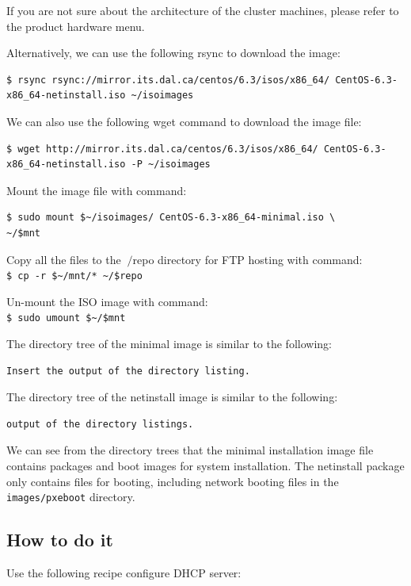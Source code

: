 If you are not sure about the architecture of the cluster machines, please refer to the product hardware menu.

Alternatively, we can use the following rsync to download the image:
\lstset{style=bashstyle}
\begin{lstlisting}
$ rsync rsync://mirror.its.dal.ca/centos/6.3/isos/x86_64/ CentOS-6.3-x86_64-netinstall.iso ~/isoimages
\end{lstlisting}

We can also use the following wget command to download the image file: 
\lstset{style=bashstyle}
\begin{lstlisting}
$ wget http://mirror.its.dal.ca/centos/6.3/isos/x86_64/ CentOS-6.3-x86_64-netinstall.iso -P ~/isoimages
\end{lstlisting}

Mount the image file with command:
\lstset{style=bashstyle}
\begin{lstlisting}
$ sudo mount $~/isoimages/ CentOS-6.3-x86_64-minimal.iso \
~/$mnt
\end{lstlisting}

Copy all the files to the $~/$repo directory for FTP hosting with command: \\
\verb|$ cp -r $~/mnt/* ~/$repo|

Un-mount the ISO image with command: \\
\verb|$ sudo umount $~/$mnt|

The directory tree of the minimal image is similar to the following:
\begin{verbatim}
Insert the output of the directory listing.
\end{verbatim}

The directory tree of the netinstall image is similar to the following:
\begin{verbatim}
output of the directory listings.
\end{verbatim}
We can see from the directory trees that the minimal installation image file contains packages and boot images for system installation. The netinstall package only contains files for booting, including network booting files in the \verb|images/pxeboot| directory.

\subsection*{How to do it}
Use the following recipe configure DHCP server:

